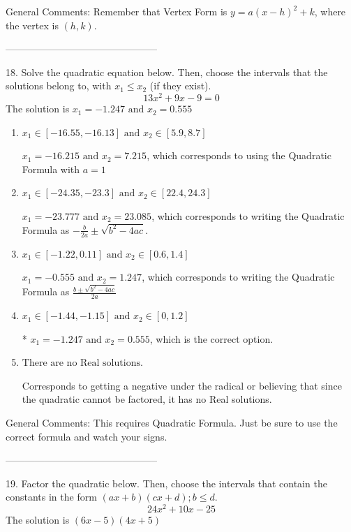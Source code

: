 \documentclass{article}[14pt]
\begin{document}
General Comments: Remember that Vertex Form is $y = a(x-h)^2+k$, where the vertex is $(h, k)$.

-----------------------------------------------

18. Solve the quadratic equation below. Then, choose the intervals that the solutions belong to, with $x_1 \leq x_2$ (if they exist).
$$ 13x^{2} +9 x -9 = 0 $$ 
The solution is $ x_1 = -1.247 \text{ and } x_2 = 0.555 $ 

\begin{enumerate}[label=\Alph*.] 
\item $ x_1 \in [-16.55, -16.13] \text{ and } x_2 \in [5.9, 8.7] $ 

  $x_1 = -16.215 \text{ and } x_2 = 7.215$, which corresponds to using the Quadratic Formula with $a=1$ 
\item $ x_1 \in [-24.35, -23.3] \text{ and } x_2 \in [22.4, 24.3] $ 

  $x_1 = -23.777 \text{ and } x_2 = 23.085$, which corresponds to writing the Quadratic Formula as $-\frac{b}{2a} \pm \sqrt{b^2 - 4ac}$. 
\item $ x_1 \in [-1.22, 0.11] \text{ and } x_2 \in [0.6, 1.4] $ 

  $x_1 = -0.555 \text{ and } x_2 = 1.247$, which corresponds to writing the Quadratic Formula as $\frac{b \pm \sqrt{b^2 - 4ac}}{2a}$ 
\item $ x_1 \in [-1.44, -1.15] \text{ and } x_2 \in [0, 1.2] $ 

 * $x_1 = -1.247 \text{ and } x_2 = 0.555$, which is the correct option. 
\item $ \text{There are no Real solutions.} $ 

 Corresponds to getting a negative under the radical or believing that since the quadratic cannot be factored, it has no Real solutions. 
\end{enumerate} 
 
General Comments: This requires Quadratic Formula. Just be sure to use the correct formula and watch your signs.

-----------------------------------------------

19. Factor the quadratic below. Then, choose the intervals that contain the constants in the form $(ax+b)(cx+d); b \leq d.$
$$ 24x^{2} +10 x -25 $$ 
The solution is $ (6x -5)(4x + 5) $ 
\end{document}
